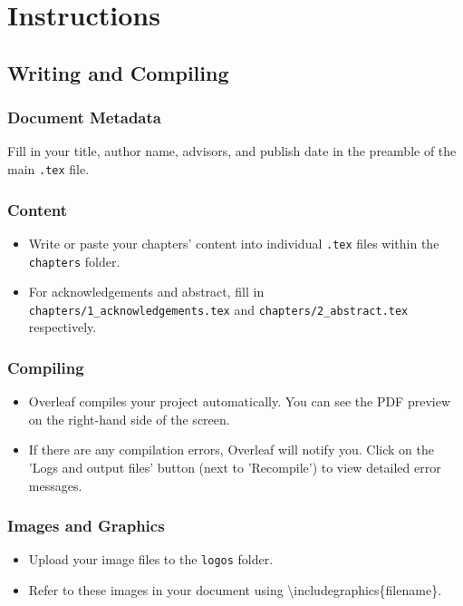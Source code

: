 \chapter{Instructions}

\section{Writing and Compiling}
\subsection{Document Metadata}
Fill in your title, author name, advisors, and publish date in the preamble of the main \texttt{.tex} file.

\subsection{Content}

\begin{itemize}
    \item Write or paste your chapters' content into individual \texttt{.tex} files within the \texttt{chapters} folder.
    \item For acknowledgements and abstract, fill in \texttt{chapters/1\_acknowledgements.tex} and \texttt{chapters/2\_abstract.tex} respectively.
\end{itemize}

\subsection{Compiling}
\begin{itemize}
    \item Overleaf compiles your project automatically. You can see the PDF preview on the right-hand side of the screen.
    \item If there are any compilation errors, Overleaf will notify you. Click on the 'Logs and output files' button (next to 'Recompile') to view detailed error messages.
\end{itemize}

\subsection{Images and Graphics}
\begin{itemize}
    \item Upload your image files to the \texttt{logos} folder.
    \item Refer to these images in your document using \textbackslash includegraphics\{filename\}.
\end{itemize}

